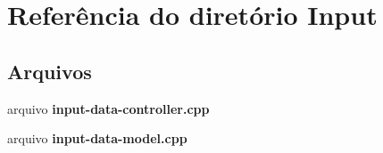 \section{Referência do diretório Input}
\label{dir_922f3c6618c5b1dacb6a422f425135c9}
\subsection*{Arquivos}
\begin{DoxyCompactItemize}
\item 
arquivo {\bf input-\/data-\/controller.\+cpp}
\item 
arquivo {\bf input-\/data-\/model.\+cpp}
\end{DoxyCompactItemize}
